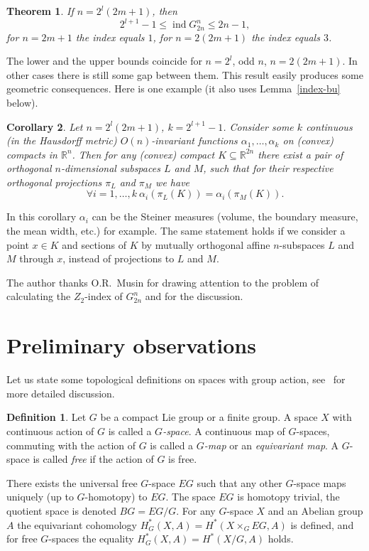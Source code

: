 \documentclass[12pt,a4paper]{amsart}
\newtheorem{thm}{Theorem}
\newtheorem{cor}[thm]{Corollary}
\theoremstyle{definition}
\newtheorem{defn}{Definition}
\theoremstyle{remark}
\begin{document}
\begin{thm}
\label{index-est}
If $n=2^l(2m+1)$, then 
$$
2^{l+1}-1\le \operatorname{ind} G_{2n}^n \le 2n-1,
$$
for $n=2m+1$ the index equals $1$, for $n=2(2m+1)$ the index equals $3$.
\end{thm}

The lower and the upper bounds coincide for $n=2^l$, odd $n$, $n=2(2m+1)$. In other cases there is still some gap between them. This result easily produces some geometric consequences. Here is one example (it also uses Lemma~\ref{index-bu} below).

\begin{cor}
Let $n=2^l(2m+1)$, $k=2^{l+1}-1$. Consider some $k$ continuous (in the Hausdorff metric) $O(n)$-invariant functions $\alpha_1,\ldots,\alpha_k$ on (convex) compacts in $\mathbb R^n$. Then for any (convex) compact $K\subseteq \mathbb R^{2n}$ there exist a pair of orthogonal $n$-dimensional subspaces $L$ and $M$, such that for their respective orthogonal projections $\pi_L$ and $\pi_M$ we have
$$
\forall i=1,\ldots,k\ \alpha_i(\pi_L(K)) = \alpha_i(\pi_M(K)).
$$
\end{cor}

In this corollary $\alpha_i$ can be the Steiner measures (volume, the boundary measure, the mean width, etc.) for example. The same statement holds if we consider a point $x\in K$ and sections of $K$ by mutually orthogonal affine $n$-subspaces $L$ and $M$ through $x$, instead of projections to $L$ and $M$.

The author thanks O.R.~Musin for drawing attention to the problem of calculating the $Z_2$-index of $G_{2n}^n$ and for the discussion.

\section{Preliminary observations}

Let us state some topological definitions on spaces with group action, see~\cite{hsiang1975} for more detailed discussion.

\begin{defn}
Let $G$ be a compact Lie group or a finite group. A space $X$ with continuous action of $G$ is called a \emph{$G$-space}. A continuous map of $G$-spaces, commuting with the action of $G$ is called a \emph{$G$-map} or an \emph{equivariant map}. A $G$-space is called \emph{free} if the action of $G$ is free.
\end{defn}

There exists the universal free $G$-space $EG$ such that any other $G$-space maps uniquely (up to $G$-homotopy) to $EG$. The space $EG$ is homotopy trivial, the quotient space is denoted $BG = EG/G$. For any $G$-space $X$ and an Abelian group $A$ the equivariant cohomology $H_G^*(X, A)=H^*(X\times_G EG, A)$ is defined, and for free $G$-spaces the equality $H_G^*(X, A) = H^*(X/G, A)$ holds.
\end{document}
